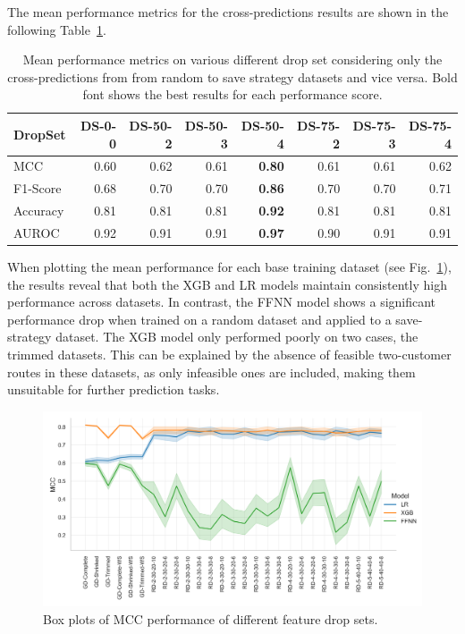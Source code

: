The mean performance metrics for the cross-predictions results are shown in the following Table~\ref{tab:featurePerformance_OnlyCrossCorrelation}.
\begin{table}[ht]
    \centering
    \begin{tabular}{lrrrrrrr}
        \toprule
        DropSet  & DS-0-0 & DS-50-2 & DS-50-3 & DS-50-4       & DS-75-2 & DS-75-3 & DS-75-4 \\
        \midrule
        MCC      & 0.60   & 0.62    & 0.61    & \textbf{0.80} & 0.61    & 0.61    & 0.62    \\
        F1-Score & 0.68   & 0.70    & 0.70    & \textbf{0.86} & 0.70    & 0.70    & 0.71    \\
        Accuracy & 0.81   & 0.81    & 0.81    & \textbf{0.92} & 0.81    & 0.81    & 0.81    \\
        AUROC    & 0.92   & 0.91    & 0.91    & \textbf{0.97} & 0.90    & 0.91    & 0.91    \\
        \bottomrule
    \end{tabular}
    \caption[Mean performance metrics on various different drop set considering only the cross-predictions from random to save strategy datasets and vice versa.]
    {Mean performance metrics on various different drop set considering only the cross-predictions from from random to save strategy datasets and vice versa.
        Bold font shows the best results for each performance score.}
    \label{tab:featurePerformance_OnlyCrossCorrelation}
\end{table}
When plotting the mean performance for each base training dataset (see Fig.~\ref{fig:mcc_filter_results_lineplot}),
the results reveal that both the XGB and LR models maintain consistently high performance across datasets. In contrast,
the FFNN model shows a significant performance drop when trained on a random dataset and applied to a save-strategy dataset.
The XGB model only performed poorly on two cases, the trimmed datasets. This can be explained by the absence of feasible
two-customer routes in these datasets, as only infeasible ones are included, making them unsuitable for further prediction tasks.
\begin{figure}[ht]
    \centering
    \includegraphics[width = .95\textwidth]{pictures/feature_filter/cross_performance_lineplot.png}
    \caption{Box plots of MCC performance of different feature drop sets.}
    \label{fig:mcc_filter_results_lineplot}
\end{figure}%
